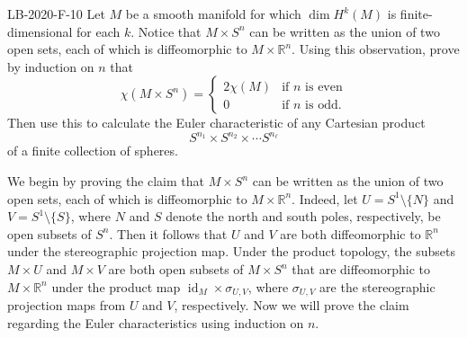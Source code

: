 \documentclass{article}
\begin{document}
	\begin{prb}{LB-2020-F-10}
		Let $M$ be a smooth manifold for which $\dim{H^{k}(M)}$ is finite-dimensional for each $k$. Notice that $M \times S^{n}$ can be written as the union of two open sets, each of which is diffeomorphic to $M \times \mathbb{R}^{n}$. Using this observation, prove by induction on $n$ that 
		\begin{equation*}
			\chi(M \times S^{n}) = 
			\begin{cases}
				2\chi(M) & \text{if $n$ is even} \\
				0 & \text{if $n$ is odd}. 
			\end{cases}
		\end{equation*}
		Then use this to calculate the Euler characteristic of any Cartesian product 
		\begin{equation*}	 
			S^{n_{1}} \times S^{n_{2}} \times \dotsm S^{n_{\ell}}
		\end{equation*}
		of a finite collection of spheres. 
	\end{prb}
	We begin by proving the claim that $M \times S^{n}$ can be written as the union of two open sets, each of which is diffeomorphic to $M \times \mathbb{R}^{n}$. Indeed, let $U = S^{1}\setminus \{N\}$ and $V = S^{1} \setminus \{S\}$, where $N$ and $S$ denote the north and south poles, respectively, be open subsets of $S^{n}$. Then it follows that $U$ and $V$ are both diffeomorphic to $\mathbb{R}^{n}$ under the stereographic projection map. Under the product topology, the subsets $M \times U$ and $M \times V$ are both open subsets of $M \times S^{n}$ that are diffeomorphic to $M\times \mathbb{R}^{n}$ under the product map $\operatorname{id}_{M} \times \sigma_{U,V}$, where $\sigma_{U, V}$ are the stereographic projection maps from $U$ and $V$, respectively. Now we will prove the claim regarding the Euler characteristics using induction on $n$. 
	
\end{document}
